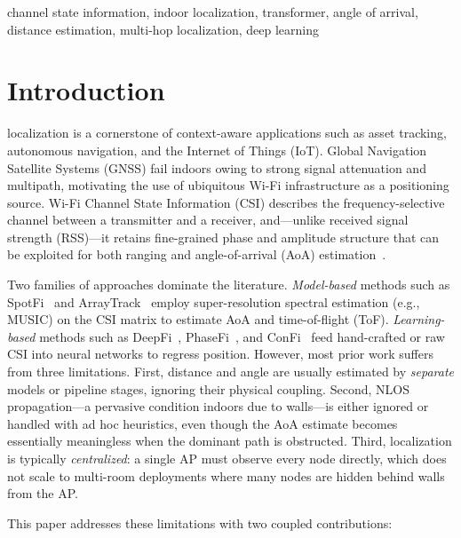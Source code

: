 \documentclass[conference]{IEEEtran}
\begin{document}
\begin{IEEEkeywords}
channel state information, indoor localization, transformer, angle of arrival,
distance estimation, multi-hop localization, deep learning
\end{IEEEkeywords}

\section{Introduction}
 localization is a cornerstone of context-aware
applications such as asset tracking, autonomous navigation, and the Internet of
Things (IoT). Global Navigation Satellite Systems (GNSS) fail indoors owing to
strong signal attenuation and multipath, motivating the use of ubiquitous
Wi-Fi infrastructure as a positioning source. Wi-Fi Channel State Information
(CSI) describes the frequency-selective channel between a transmitter and a
receiver, and---unlike received signal strength (RSS)---it retains fine-grained
phase and amplitude structure that can be exploited for both ranging and
angle-of-arrival (AoA) estimation~\cite{halperin2011tool}.

Two families of approaches dominate the literature. \emph{Model-based} methods
such as SpotFi~\cite{kotaru2015spotfi} and ArrayTrack~\cite{xiong2013arraytrack}
employ super-resolution spectral estimation (e.g., MUSIC) on the CSI matrix to
estimate AoA and time-of-flight (ToF). \emph{Learning-based} methods such as
DeepFi~\cite{wang2015deepfi}, PhaseFi~\cite{wang2016phasefi}, and
ConFi~\cite{chen2017confi} feed hand-crafted or raw CSI into neural networks to
regress position. However, most prior work suffers from three limitations.
First, distance and angle are usually estimated by \emph{separate} models or
pipeline stages, ignoring their physical coupling. Second, NLOS propagation---a
pervasive condition indoors due to walls---is either ignored or handled with ad
hoc heuristics, even though the AoA estimate becomes essentially meaningless
when the dominant path is obstructed. Third, localization is typically
\emph{centralized}: a single AP must observe every node directly, which does not
scale to multi-room deployments where many nodes are hidden behind walls from
the AP.

This paper addresses these limitations with two coupled contributions:
\end{document}
